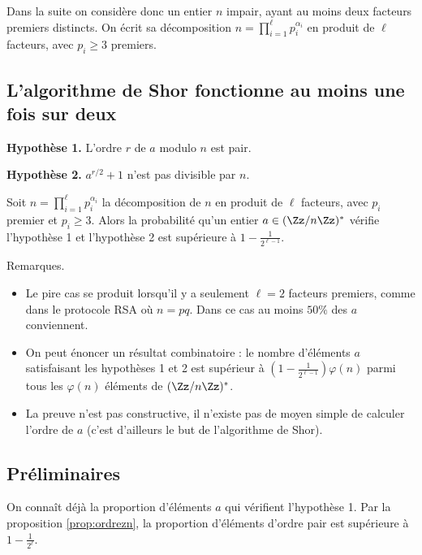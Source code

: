 \documentclass[11pt,class=report,crop=false]{standalone}
\begin{document}
Dans la suite on considère donc un entier $n$ impair, ayant au moins deux facteurs premiers distincts. On écrit sa décomposition $n = \prod_{i=1}^\ell p_i^{\alpha_i}$ en produit de $\ell$ facteurs, avec $p_i\ge3$ premiers.


\subsection{L'algorithme de Shor fonctionne au moins une fois sur deux}


\textbf{Hypothèse 1.} L'ordre $r$ de $a$ modulo $n$ est pair.

\textbf{Hypothèse 2.} $a^{r/2}+1$ n'est pas divisible par $n$.

\begin{theoreme}
\label{th:Shor}
Soit $n = \prod_{i=1}^\ell p_i^{\alpha_i}$ la décomposition de $n$ en produit de $\ell$ facteurs, avec $p_i$ premier et $p_i\ge3$. 
Alors la probabilité qu'un entier $a \in (\Zz/n\Zz)^*$ vérifie l'hypothèse 1 et l'hypothèse 2 est supérieure à $1 - \frac{1}{2^{\ell-1}}$. 
\end{theoreme}

Remarques.
\begin{itemize}
  \item Le pire cas se produit lorsqu'il y a seulement $\ell=2$ facteurs premiers, comme dans le protocole RSA où $n=pq$. Dans ce cas au moins $50\%$ des $a$ conviennent.

  \item On peut énoncer un résultat combinatoire : le nombre d'éléments $a$ satisfaisant les hypothèses 1 et 2 est supérieur à $(1 - \frac{1}{2^{\ell-1}})\varphi(n)$ parmi tous les $\varphi(n)$ éléments de $(\Zz/n\Zz)^*$.

  \item La preuve n'est pas constructive, il n'existe pas de moyen simple de calculer l'ordre de $a$ (c'est d'ailleurs le but de l'algorithme de Shor).

\end{itemize}


\subsection{Préliminaires}

On connaît déjà la proportion d'éléments $a$ qui vérifient l'hypothèse 1. Par la 
proposition \ref{prop:ordrezn}, la proportion d'éléments d'ordre pair est supérieure à 
$1-\frac{1}{2^\ell}$.
\end{document}
